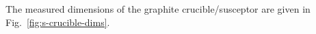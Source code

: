 \documentclass[10pt,letterpaper]{article}
\begin{document}
The measured dimensions of the graphite
crucible/susceptor are given in Fig.~\ref{fig:s-crucible-dims}.
\end{document}
